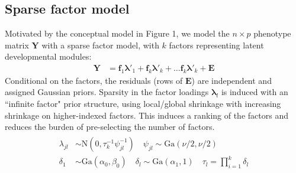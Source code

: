 \documentclass[landscape,paperwidth=48in,paperheight=36in,fontscale=0.35]{baposter}
\begin{document}
\begin{poster}
{\subsection*{Sparse factor model}
Motivated by the conceptual model in Figure 1, we model the $n \times p$ phenotype matrix $\mathbf{Y}$ with a sparse factor model, with $k$ factors representing latent developmental modules:
\begin{align}
\mathbf{Y} &= \mathbf{f}_1\pmb{\lambda}'_1 + \mathbf{f}_k\pmb{\lambda}'_k + \dots \mathbf{f}_k\pmb{\lambda}'_k + \mathbf{E}
\end{align}
Conditional on the factors, the residuals (rows of $\mathbf{E}$) are independent and assigned Gaussian priors.
Sparsity in the factor loadings $\pmb{\lambda}_l$ is induced with an ``infinite factor"\citep{Bhattacharya:2011gh} prior structure, using local/global shrinkage with increasing shrinkage on higher-indexed factors. This induces a ranking of the factors and reduces the burden of pre-selecting the number of factors.
\begin{align}\begin{split}
\lambda_{jl} &\sim \mbox{N}(0,\tau^{-1}_k \psi^{-1}_{jl}) \quad \psi_{jl} \sim \mbox{Ga}(\nu/2,\nu/2) \\
\delta_1 &\sim \mbox{Ga}(\alpha_0,\beta_0)\quad \delta_l \sim \mbox{Ga}(\alpha_1,1) \quad 
\tau_l = \prod_{i=1}^k \delta_l
\end{split}\end{align}

}
\end{poster}
\end{document}
